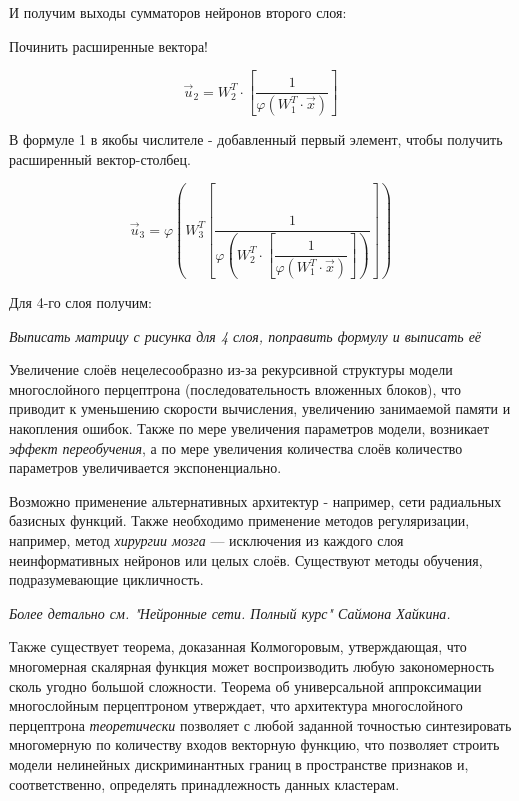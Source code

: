 \documentclass{article}
\numberwithin{equation}{subsection}
\begin{document}
И получим выходы сумматоров нейронов второго слоя:

\begin{myquote}
    Починить расширенные вектора!
\end{myquote}

\begin{equation}
    \vec{u}_2 = W_2^T \cdot [\dfrac{1}{\varphi(W_1^T \cdot \vec{x})}]
\end{equation}


В формуле 1 в якобы числителе - добавленный первый элемент, чтобы получить расширенный вектор-столбец.

\begin{equation}
    \vec{u}_3 = \varphi(W_3^T[\dfrac{1}{\varphi(W_2^T \cdot [\dfrac{1}{\varphi(W_1^T \cdot \vec{x})}])}])
\end{equation}

Для 4-го слоя получим:

\begin{myquote}
    \textit{Выписать матрицу с рисунка для 4 слоя, поправить формулу и выписать её}
\end{myquote}

Увеличение слоёв нецелесообразно из-за рекурсивной структуры модели многослойного 
перцептрона (последовательность вложенных блоков), что приводит к уменьшению 
скорости вычисления, увеличению занимаемой памяти и накопления ошибок.
Также по мере увеличения параметров модели, возникает \textit{эффект переобучения}, 
а по мере увеличения количества слоёв количество параметров увеличивается экспоненциально.

Возможно применение альтернативных архитектур - например, сети радиальных базисных функций.
Также необходимо применение методов регуляризации, например, метод \textit{хирургии мозга} ---
исключения из каждого слоя неинформативных нейронов или целых слоёв.
Существуют методы обучения, подразумевающие цикличность.

\begin{myquote}
    \textit{Более детально см. "Нейронные сети. Полный курс" Саймона Хайкина.}
\end{myquote}

Также существует теорема, доказанная Колмогоровым, утверждающая, что многомерная 
скалярная функция может воспроизводить любую закономерность сколь угодно большой 
сложности. Теорема об универсальной аппроксимации многослойным перцептроном 
утверждает, что архитектура многослойного перцептрона \textit{теоретически} 
позволяет с любой заданной точностью синтезировать многомерную по количеству 
входов векторную функцию, что позволяет строить модели нелинейных 
дискриминантных границ в пространстве признаков и, соответственно, определять 
принадлежность данных кластерам. 
\end{document}
